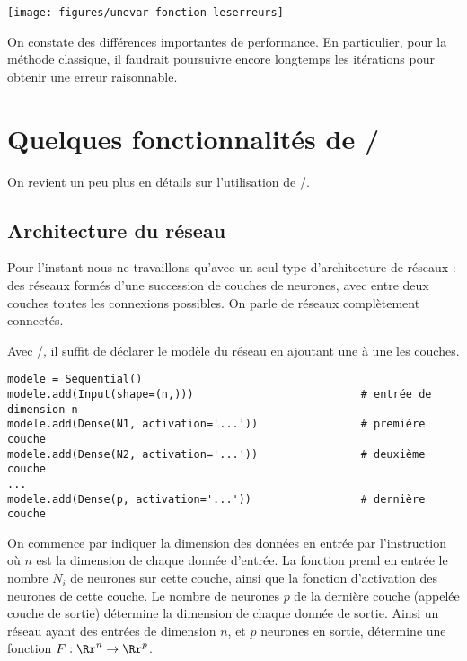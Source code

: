 \documentclass[11pt,class=report,crop=false]{standalone}
\begin{document}
\begin{center}
\texttt{[image: figures/unevar-fonction-leserreurs]}
\end{center}

On constate des différences importantes de performance. En particulier, pour la méthode classique, il faudrait poursuivre encore longtemps les itérations pour obtenir une erreur raisonnable.


\section{Quelques fonctionnalités de \tensorflow/\keras}

On revient un peu plus en détails sur l'utilisation de  \tensorflow/\keras.

\subsection{Architecture du réseau}

Pour l'instant nous ne travaillons qu'avec un seul type d'architecture de réseaux : des réseaux formés d'une succession de couches de neurones, avec entre deux couches toutes les connexions possibles. On parle de réseaux complètement connectés.



Avec \tensorflow/\keras, il suffit de déclarer le modèle du réseau en ajoutant une à une les couches.
\begin{lstlisting} 
modele = Sequential()
modele.add(Input(shape=(n,)))                          # entrée de dimension n
modele.add(Dense(N1, activation='...'))                # première couche
modele.add(Dense(N2, activation='...'))                # deuxième couche
...
modele.add(Dense(p, activation='...'))                 # dernière couche
\end{lstlisting}
On commence par indiquer la dimension des données en entrée par l'instruction  où $n$ est la dimension de chaque donnée d'entrée.
La fonction  prend en entrée le nombre $N_i$ de neurones sur cette couche, ainsi que la fonction d'activation des neurones de cette couche.
Le nombre de neurones $p$ de la dernière couche (appelée couche de sortie) détermine la dimension de chaque donnée de sortie. Ainsi un réseau ayant des entrées de dimension $n$, et $p$ neurones en sortie, détermine une fonction $F : \Rr^n \to \Rr^p$.
\end{document}
